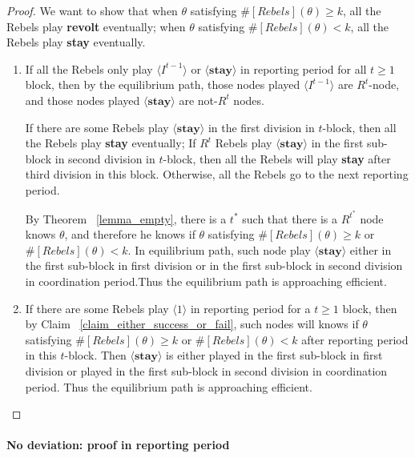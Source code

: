 \documentclass[12pt,letter]{article}
\theoremstyle{definition}
\theoremstyle{remark}
\theoremstyle{claim}
\begin{document}
\begin{proof}
We want to show that when $\theta$ satisfying $\#[Rebels](\theta)\geq k$, all the Rebels play \textbf{revolt} eventually; when $\theta$ satisfying $\#[Rebels](\theta)< k$, all the Rebels play \textbf{stay} eventually.
\begin{enumerate}
\item If all the Rebels only play $\langle I^{t-1} \rangle$ or $\langle \textbf{stay} \rangle$ in reporting period for all $t\geq 1$ block, then by the equilibrium path, those nodes played $\langle I^{t-1} \rangle$ are $R^t$-node, and those nodes played $\langle \textbf{stay} \rangle$ are not-$R^t$ nodes. 

If there are some Rebels play $\langle \textbf{stay} \rangle$ in the first division in $t$-block, then all the Rebels play \textbf{stay} eventually; If $R^t$ Rebels play $\langle \textbf{stay} \rangle$ in the first sub-block in second division in $t$-block, then all the Rebels will play \textbf{stay} after third division in this block. Otherwise, all the Rebels go to the next reporting period.

By Theorem ~\ref{lemma_empty}, there is a $t^{*}$ such that there is a $R^{t^{*}}$ node knows $\theta$, and therefore he knows if $\theta$ satisfying $\#[Rebels](\theta)\geq k$ or $\#[Rebels](\theta)< k$. In equilibrium path, such node play $\langle \textbf{stay} \rangle$ either in the first sub-block in first division or in the first sub-block in second division in coordination period.Thus the equilibrium path is approaching efficient.

\item If there are some Rebels play $\langle 1 \rangle$ in reporting period for a $t\geq 1$ block, then by Claim ~\ref{claim_either_success_or_fail}, such nodes will knows if $\theta$ satisfying $\#[Rebels](\theta)\geq k$ or $\#[Rebels](\theta)< k$ after reporting period in this $t$-block. Then $\langle \textbf{stay} \rangle$ is either played in the first sub-block in first division or played in the first sub-block in second division in coordination period. Thus the equilibrium path is approaching efficient.

 
\end{enumerate}

\end{proof}



\paragraph{No deviation: proof in reporting period}
\end{document}
